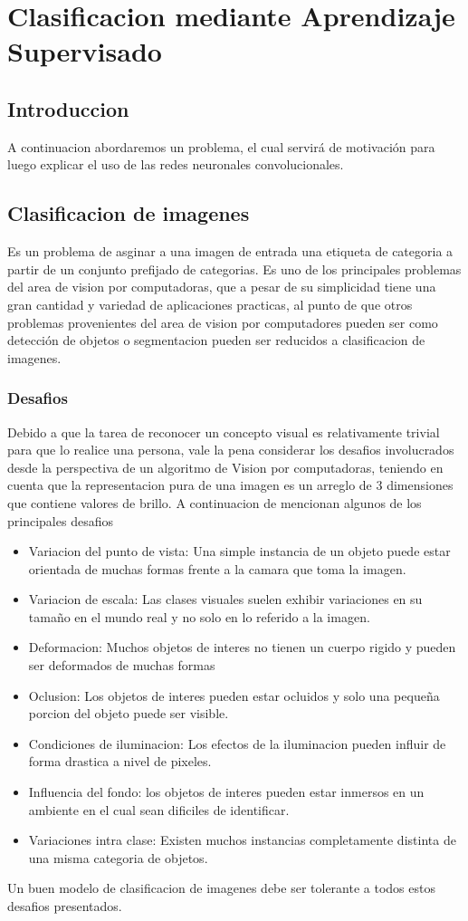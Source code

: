 \documentclass[a4paper,11pt,spanish]{book}
\begin{document}
    
    \section{Clasificacion mediante Aprendizaje Supervisado}
      \subsection{Introduccion}
	A continuacion abordaremos un problema, el cual servirá de motivación para luego explicar el uso de las redes neuronales convolucionales.

      \subsection{Clasificacion de imagenes}
	Es un problema de asginar a una imagen de entrada una etiqueta de categoria a partir de un conjunto prefijado de categorias.
	Es uno de los principales problemas del area de vision por computadoras, que a pesar de su simplicidad tiene una gran cantidad y variedad de aplicaciones practicas, 
	al punto de que otros problemas provenientes del area de vision por computadores pueden ser como detección de objetos o segmentacion pueden ser reducidos a clasificacion de imagenes.

	\subsubsection {Desafios}
	  Debido a que la tarea de reconocer un concepto visual es relativamente trivial para que lo realice una persona, vale la pena considerar los desafios involucrados desde la perspectiva de
	  un algoritmo de Vision por computadoras, teniendo en cuenta que la representacion pura de una imagen es un arreglo de 3 dimensiones que contiene valores de brillo. A continuacion de mencionan
	  algunos de los principales desafios
	  \begin{itemize}
	    \item Variacion del punto de vista: Una simple instancia de un objeto puede estar orientada de muchas formas frente a la camara que toma la imagen.
	    \item Variacion de escala: Las clases visuales suelen exhibir variaciones en su tamaño en el mundo real y no solo en lo referido a la imagen.
	    \item Deformacion: Muchos objetos de interes no tienen un cuerpo rigido y pueden ser deformados de muchas formas
	    \item Oclusion: Los objetos de interes pueden estar ocluidos y solo una pequeña porcion del objeto puede ser visible.
	    \item Condiciones de iluminacion: Los efectos de la iluminacion pueden influir de forma drastica a nivel de pixeles.
	    \item Influencia del fondo: los objetos de interes pueden estar inmersos en un ambiente en el cual sean dificiles de identificar.
	    \item Variaciones intra clase: Existen muchos instancias completamente distinta de una misma categoria de objetos.
	  \end{itemize}
	  Un buen modelo de clasificacion de imagenes debe ser tolerante a todos estos desafios presentados.
\end{document}
